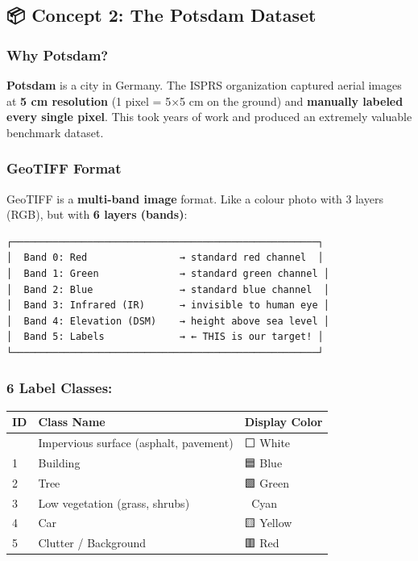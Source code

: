 \documentclass[11pt]{article}
\begin{document}
\subsection{📦 Concept 2: The Potsdam
Dataset}\label{concept-2-the-potsdam-dataset}

\subsubsection{Why Potsdam?}\label{why-potsdam}

\textbf{Potsdam} is a city in Germany. The ISPRS organization captured
aerial images at \textbf{5 cm resolution} (1 pixel = 5×5 cm on the
ground) and \textbf{manually labeled every single pixel}. This took
years of work and produced an extremely valuable benchmark dataset.

\subsubsection{GeoTIFF Format}\label{geotiff-format}

GeoTIFF is a \textbf{multi-band image} format. Like a colour photo with
3 layers (RGB), but with \textbf{6 layers (bands)}:

\begin{verbatim}
┌─────────────────────────────────────────────────────┐
│  Band 0: Red                → standard red channel  │
│  Band 1: Green              → standard green channel │
│  Band 2: Blue               → standard blue channel  │
│  Band 3: Infrared (IR)      → invisible to human eye │
│  Band 4: Elevation (DSM)    → height above sea level │
│  Band 5: Labels             → ← THIS is our target! │
└─────────────────────────────────────────────────────┘
\end{verbatim}

\subsubsection{6 Label Classes:}\label{label-classes}

\begin{longtable}[]{@{}lll@{}}
\toprule\noalign{}
ID & Class Name & Display Color \\
\midrule\noalign{}
\endhead
\bottomrule\noalign{}
\endlastfoot
0 & Impervious surface (asphalt, pavement) & ⬜ White \\
1 & Building & 🟦 Blue \\
2 & Tree & 🟩 Green \\
3 & Low vegetation (grass, shrubs) & 🩵 Cyan \\
4 & Car & 🟨 Yellow \\
5 & Clutter / Background & 🟥 Red \\
\end{longtable}
\end{document}
